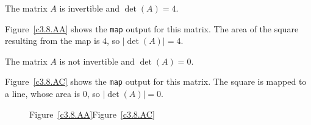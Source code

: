 \documentclass{ximera}
\begin{document}
\newpage
{} \ans The matrix $A$ is invertible and $\det(A) = 4$.

\soln Figure~\ref{c3.8.AA} shows the {\tt map} output for this matrix.
The area of the square resulting from the map is $4$, so $|\det(A)| = 4$.

 \ans The matrix $A$ is not invertible and $\det(A) = 0$.

\soln Figure~\ref{c3.8.AC} shows the {\tt map} output for this matrix.
The square is mapped to a line, whose area is $0$, so $|\det(A)| = 0$.

\begin{figure}[htb]
                       \centerline{%
                       }
	\centerline{Figure~\ref{c3.8.AA}\hspace{2.1in}Figure~\ref{c3.8.AC}}
\end{figure}
\end{document}
